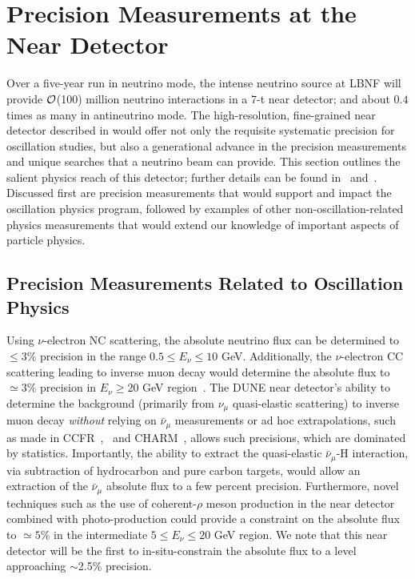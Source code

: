 \section{Precision Measurements at the Near Detector} 
\label{sec-nd-sbp} 

Over a five-year run in neutrino mode,  %
the intense neutrino source at LBNF will provide 
${\cal {O}}$(100) million neutrino interactions in a 7-t near detector; 
and about $0.4$ times as many in antineutrino mode. %
The high-resolution, fine-grained near detector described in \voldune would offer not only the requisite systematic 
precision for  oscillation studies, but also a generational advance in the precision measurements and unique 
searches that a neutrino beam can provide.  This section outlines the salient physics reach of this detector; further details can be 
found in~\cite{DPR} and~\cite{Adams:2013qkq}. Discussed first are precision measurements that would support 
and impact the oscillation physics program, followed by examples of other non-oscillation-related 
physics measurements that would extend our knowledge of important aspects of particle physics. 


\subsection{Precision Measurements Related to Oscillation Physics}


Using  $\nu$-electron NC scattering, the absolute neutrino flux can be determined 
to $\leq 3\%$ precision in the range $0.5 \leq E_\nu \leq 10$ GeV. Additionally, the $\nu$-electron CC scattering leading to  inverse 
muon decay would determine the absolute flux to $\simeq 3\%$ precision in $E_\nu \geq 20$ GeV region~\cite{ABS-FLUX}. 
The DUNE near detector's ability to determine the background (primarily from $\nu_{\mu}$ quasi-elastic scattering) 
to inverse muon decay \textit{without} relying on $\bar \nu_\mu$ measurements or 
ad hoc extrapolations, such as made in CCFR~\cite{CCFR-IMD-Mishra-89},~\cite{CCFR-IMD-Mishra-90} 
and CHARM~\cite{CHARM-IMD-95}, allows such precisions, which are dominated by statistics. 
Importantly, the ability to extract the quasi-elastic 
$\bar \nu_\mu$-H interaction, via subtraction of hydrocarbon and pure carbon targets, would allow an extraction of 
the $\bar \nu_\mu$ absolute flux to a few percent precision. Furthermore, novel techniques such as the use of 
coherent-$\rho$ meson production in the near detector combined with photo-production could provide a constraint 
on the absolute flux to $\simeq 5\%$ in the intermediate $5 \leq E_\nu \leq 20$ GeV region. 
We note that this near detector will be the first %
to in-situ-constrain the absolute flux to a level approaching $\sim$2.5\% precision. 

